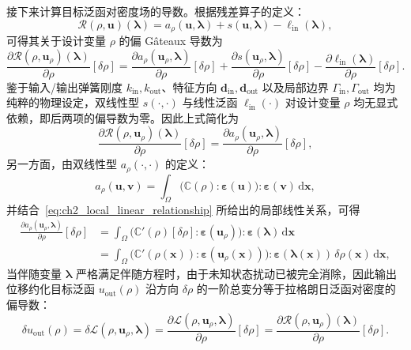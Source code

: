 接下来计算目标泛函对密度场的导数。根据残差算子的定义：
\[
\mathcal{R}(\rho,\boldsymbol{u})(\boldsymbol{\lambda}) = a_\rho(\boldsymbol{u},\boldsymbol{\lambda}) + s(\boldsymbol{u},\boldsymbol{\lambda}) - \ell_{\mathrm{in}}(\boldsymbol{\lambda}),
\]
可得其关于设计变量 $\rho$ 的偏 Gâteaux 导数为
\[
\frac{\partial\mathcal{R}(\rho,\boldsymbol{u}_\rho)(\boldsymbol{\lambda})}{\partial\rho}[\delta\rho] = \frac{\partial a_\rho(\boldsymbol{u}_\rho,\boldsymbol{\lambda})}{\partial\rho}[\delta\rho] + \frac{\partial s(\boldsymbol{u}_\rho,\boldsymbol{\lambda})}{\partial\rho}[\delta\rho] - \frac{\partial\ell_{\mathrm{in}}(\boldsymbol{\lambda})}{\partial\rho}[\delta\rho].
\]
鉴于输入/输出弹簧刚度 $k_{\mathrm{in}}, k_{\mathrm{out}}$、特征方向 $\boldsymbol{d}_{\mathrm{in}}, \boldsymbol{d}_{\mathrm{out}}$ 以及局部边界 $\Gamma_{\mathrm{in}}, \Gamma_{\mathrm{out}}$ 均为纯粹的物理设定，双线性型 $s(\cdot, \cdot)$ 与线性泛函 $\ell_{\mathrm{in}}(\cdot)$ 对设计变量 $\rho$ 均无显式依赖，即后两项的偏导数为零。因此上式简化为
\[
\frac{\partial\mathcal{R}(\rho,\boldsymbol{u}_\rho)(\boldsymbol{\lambda})}{\partial\rho}[\delta\rho] = \frac{\partial a_\rho(\boldsymbol{u}_\rho,\boldsymbol{\lambda})}{\partial\rho}[\delta\rho],
\]
另一方面，由双线性型 $a_\rho(\cdot,\cdot)$ 的定义：
\[
a_\rho(\boldsymbol{u},\boldsymbol{v}) = \int_{\Omega}\big(\mathbb{C}(\rho):\boldsymbol{\varepsilon}(\boldsymbol{u})\big) :\boldsymbol{\varepsilon}(\boldsymbol{v})\,\mathrm{d}\boldsymbol{x},
\]
并结合~\eqref{eq:ch2_local_linear_relationship} 所给出的局部线性关系，可得
\[
\begin{aligned} 
	\frac{\partial a_\rho(\boldsymbol{u}_\rho,\boldsymbol{\lambda})}{\partial\rho}[\delta\rho] &= \int_{\Omega} \big(\mathbb{C}'(\rho)[\delta\rho]:\boldsymbol{\varepsilon}(\boldsymbol{u}_\rho)\big) :\boldsymbol{\varepsilon}(\boldsymbol{\lambda})\,\mathrm{d}\boldsymbol{x}\\ &= \int_{\Omega} \big(\mathbb{C}'(\rho(\boldsymbol{x})):\boldsymbol{\varepsilon}(\boldsymbol{u}_\rho(\boldsymbol{x}))\big) : \boldsymbol{\varepsilon}(\boldsymbol{\lambda}(\boldsymbol{x}))\, \delta\rho(\boldsymbol{x})\,\mathrm{d}\boldsymbol{x}, 
\end{aligned}
\]
当伴随变量 $\boldsymbol{\lambda}$ 严格满足伴随方程时，由于未知状态扰动已被完全消除，因此输出位移约化目标泛函 $u_{\mathrm{out}}(\rho)$ 沿方向 $\delta\rho$ 的一阶总变分等于拉格朗日泛函对密度的偏导数：
\[
\delta u_{\mathrm{out}}(\rho) = \delta\mathcal{L}(\rho,\boldsymbol{u}_\rho,\boldsymbol{\lambda}) = \frac{\partial\mathcal{L}(\rho,\boldsymbol{u}_\rho,\boldsymbol{\lambda})}{\partial\rho}[\delta\rho] = \frac{\partial\mathcal{R}(\rho,\boldsymbol{u}_\rho)(\boldsymbol{\lambda})}{\partial\rho}[\delta\rho].
\]
